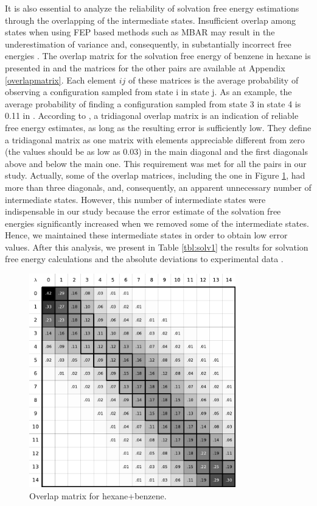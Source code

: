 It is also essential to analyze the reliability of solvation free energy estimations through the overlapping of the intermediate states. Insufficient overlap among states when using FEP based methods such as MBAR may result in the underestimation of variance and, consequently, in substantially incorrect free energies \cite{klimovich}. The overlap matrix for the solvation free energy of benzene in hexane is presented in  and the matrices for the other pairs are available at Appendix \ref{overlapmatrix}. Each element $ij$ of these matrices is the average probability of observing a configuration sampled from state i in state j. As an example, the average probability of finding a configuration sampled from state 3 in state 4 is 0.11 in . According to , a tridiagonal overlap matrix is an indication of reliable free energy estimates, as long as the resulting error is sufficiently low. They define a tridiagonal matrix as one matrix with elements appreciable different from zero (the values should be as low as 0.03) in the main diagonal and the first diagonals above and below the main one. This requirement was met for all the pairs in our study. Actually, some of the overlap matrices, including the one in Figure \ref{fig:hexove}, had more than three diagonals, and, consequently, an apparent unnecessary number of intermediate states. However, this number of intermediate states were indispensable in our study because the error estimate of the solvation free energies significantly increased when we removed some of the intermediate states. Hence, we maintained these intermediate states in order to obtain low error values. After this analysis, we present in Table \ref{tbl:solv1} the results for solvation free energy calculations and the absolute deviations to experimental data \cite{doi:10.1021/ci034120c}.  

\begin{figure}[h]
    \centering
    \includegraphics[width=0.8\textwidth]{Figures/ohex_benz}
    \caption{Overlap matrix for hexane+benzene.}
    \label{fig:hexove}
\end{figure}

